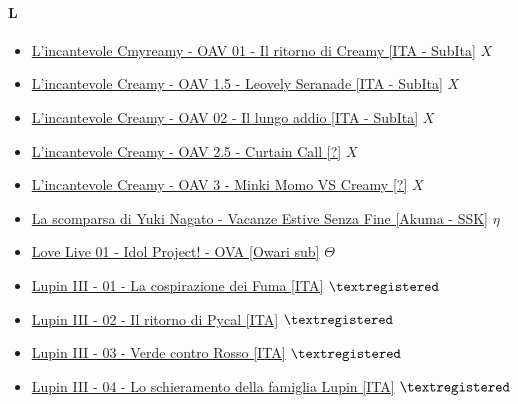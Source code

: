 		\paragraph{L} \hypertarget{OL}{}
			\begin{itemize}
				\item \href{https://mega.nz/#!JuYjALCK!8HTtXzUcjb8cN7adST6xnCuKEbieigW_DLDn_bBsoLA} {L'incantevole Cmyreamy - OAV 01 - Il ritorno di Creamy [ITA - SubIta]} $X$ \\ 
				\item \href{https://mega.nz/#!xrZ3hCIL!O3NteW6ZxsniPRnMUbHPhY1vsj4_0Eel6Gu-zrFyUoc} {L'incantevole Creamy - OAV 1.5 - Leovely Seranade [ITA - SubIta]} $X$ \\
				\item \href{https://mega.nz/#!03ginSYI!cM1BwB662ulmsx238-fxfitHPC8B77GTu8MdvBx1020} {L'incantevole Creamy - OAV 02 - Il lungo addio [ITA - SubIta]} $X$ \\				
				\item \href{https://mega.nz/#F!13hgnKLD!DyDcBBkMfOs98OkiK9JgWQ} {L'incantevole Creamy - OAV 2.5 - Curtain Call [?]} $X$ \\
				\item \href{https://mega.nz/#!tmhAxD7J!4p-_ua-rg3IpOhMWmPZPENlxgykrR1jOjOmbIbKYwPY} {L'incantevole Creamy - OAV 3 - Minki Momo VS Creamy [?]} $X$ \\
				\item \href{https://mega.nz/#!wZVhVRgB!X93GlK53J9v3w3Lqr_2G3XKu0Lf_dOh3EA6NOhPaWec} {La scomparsa di Yuki Nagato - Vacanze Estive Senza Fine [Akuma - SSK]} $\eta$ \\  
				\item \href{https://mega.nz/#!5XwyHYqa!MGVAkk_WSPyp5JZr2hDnCcENpIZFFooanffgkYmWTjo} {Love Live 01 - Idol Project! - OVA [Owari sub]} $\varTheta$ \\  
				\item \href{https://mega.nz/#!yqA0hbTQ!_1fRY0veMzYr5oQEtKDCZ0NYcFSGtFWUZP5XSzPGffg} {Lupin III - 01 - La cospirazione dei Fuma [ITA]} $\textregistered$ \\  
				\item \href{https://mega.nz/#!KnY1GLKD!hIfSxUxU9ZTXL7yQIjgUw7EcviTiJDeEYY8ZjVfizLE} {Lupin III - 02 - Il ritorno di Pycal [ITA]} $\textregistered$ \\  
				\item \href{https://mega.nz/#!WyhSxRoZ!CYZr77EsgSyCo9WcX8JalbpBVwfp8ofn7IUKVB3ltW8} {Lupin III - 03 - Verde contro Rosso [ITA]} $\textregistered$ \\  
				\item \href{https://mega.nz/#!LjhkAACK!3tVnMYYLspvVJSRjU9x95NMsgtYUVzcmTZh_q8chA7E} {Lupin III - 04 - Lo schieramento della famiglia Lupin [ITA]} $\textregistered$ \\  
	
			\end{itemize}
		
